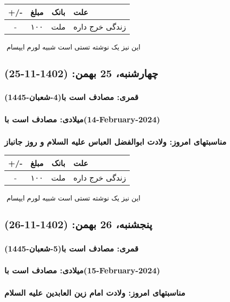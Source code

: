 \documentclass{article}
\newcommand{\rnote}[1]{\marginpar{\textcolor{color}{\StrSubstitute{\##1}{ }{\_}}}}
\newcommand{\myRow}[4]{
    #1 & #2 & #3 & #4 \\ \hline
}
\begin{document}
\begin{tabular}{ | c | c | c | p{5cm} |}
    \hline
    \myRow{ +/- }{مبلغ}{بانک}{علت}
    \myRow{-}{۱۰۰}{ملت}{زندگی خرج داره}
\end{tabular}
\newline
\newline

‌
\rnote{تست}
این نیز یک نوشته تستی است شبیه لورم ایپسام




\newpage
{}
\textcolor{color}{
\section{ چهارشنبه، 25 بهمن: (1402-11-25) }
\subsubsection*{قمری: مصادف است با(4-شعبان-1445)} 
\subsubsection*{میلادی: مصادف است با(14-February-2024)}
\subsubsection*{مناسبتهای امروز: ولادت ابوالفضل العباس علیه السلام و روز جانباز}
}


\begin{tabular}{ | c | c | c | p{5cm} |}
    \hline
    \myRow{ +/- }{مبلغ}{بانک}{علت}
    \myRow{-}{۱۰۰}{ملت}{زندگی خرج داره}
\end{tabular}
\newline
\newline

‌
\rnote{تست}
این نیز یک نوشته تستی است شبیه لورم ایپسام




\newpage
{}
\textcolor{color}{
\section{ پنجشنبه، 26 بهمن: (1402-11-26) }
\subsubsection*{قمری: مصادف است با(5-شعبان-1445)} 
\subsubsection*{میلادی: مصادف است با(15-February-2024)}
\subsubsection*{مناسبتهای امروز: ولادت امام زین العابدین علیه السلام}
}
\end{document}

